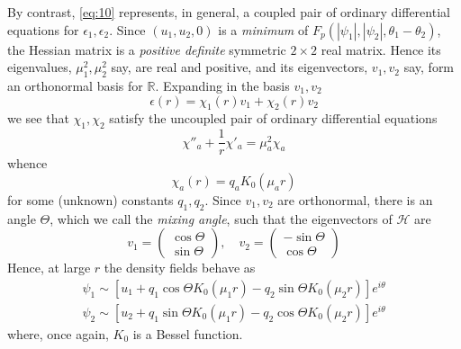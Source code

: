 By contrast, \eqref{eq:10} represents, in general, a coupled pair of ordinary 
differential equations for \( \epsilon_1, \epsilon_2 \). Since 
\( (u_1, u_2, 0 ) \) is a \textit{minimum} of 
\( F_p(|\psi_1|, |\psi_2|, \theta_1 - \theta_2) \), the Hessian matrix is a 
\textit{positive definite} symmetric \( 2\times2 \) real matrix. Hence its 
eigenvalues, \( \mu_1^2, \mu_2^2\) say, are real and positive, and its 
eigenvectors, \( v_1, v_2 \) say, form an orthonormal basis for 
\( \mathbb{R} \). Expanding in the basis \( v_1, v_2 \)
\begin{equation}
    \epsilon(r) = \chi_1(r) v_1 + \chi_2(r) v_2
    \label{eq:17}
\end{equation}
we see that \( \chi_1, \chi_2 \) satisfy the uncoupled pair of ordinary 
differential equations
\begin{equation}
    \chi''_a + \frac{1}{r}\chi'_a = \mu_a^2 \chi_a
    \label{eq:18}
\end{equation}
whence 
\begin{equation}
    \chi_a(r) = q_a K_0(\mu_a r)
    \label{eq:19}
\end{equation}
for some (unknown) constants \( q_1, q_2 \). Since \( v_1, v_2 \) are 
orthonormal, there is an angle \( \Theta \), which we call the \emph{mixing 
angle}, such that the eigenvectors of \( \mathcal{H} \) are
\begin{equation}
    v_1 = \left( \begin{array}{c}
        \cos\Theta \\
        \sin\Theta
    \end{array} \right), \quad
    v_2 = \left( \begin{array}{c}
        -\sin\Theta \\
        \cos\Theta
    \end{array} \right)
    \label{eq:20}
\end{equation}
Hence, at large \( r \) the density fields behave as
\begin{gather}
    \psi_1 \sim \left[ u_1 + q_1\cos\Theta K_0(\mu_1 r) - 
        q_2\sin\Theta K_0(\mu_2 r) \right]e^{i\theta} \nonumber \\
    \psi_2 \sim \left[ u_2 + q_1\sin\Theta K_0(\mu_1 r) - 
        q_2\cos\Theta K_0(\mu_2 r) \right]e^{i\theta}
    \label{eq:21}
\end{gather}
where, once again, \( K_0 \) is a Bessel function.

